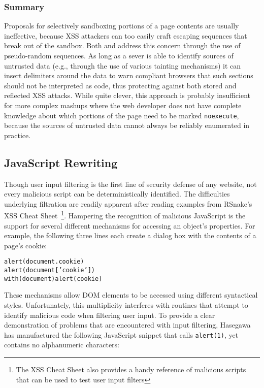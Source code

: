 \documentclass{acmtrans2m}
\begin{document}
\subsubsection*{Summary}
Proposals for selectively sandboxing portions of a page contents are usually ineffective, because XSS attackers can too easily craft escaping sequences that break out of the sandbox.
Both  and  address this concern through the use of pseudo-random sequences.
 As long as a sever is able to identify sources of untrusted data (e.g., through the use of various tainting mechanisms) it can insert delimiters around the data to warn compliant browsers that such sections should not be interpreted as code, thus protecting against both stored and reflected XSS attacks.
While quite clever, this approach is probably insufficient for more complex mashups where the web developer does not have complete knowledge about which portions of the page need to be marked \texttt{noexecute}, because the sources of untrusted data cannot always be reliably enumerated in practice.

\subsection{JavaScript Rewriting}\label{sec:jsfilter-problems}
Though user input filtering is the first line of security defense of any website, not every malicious script can be deterministically identified.
The difficulties underlying filtration are readily apparent after reading examples from RSnake's XSS Cheat Sheet~\cite{xsscheatsheet}\footnote{The XSS Cheat Sheet also provides a handy reference of malicious scripts that can be used to test user input filters}.
Hampering the recognition of malicious JavaScript is the support for several different mechanisms for accessing an object's properties.
For example, the following three lines each create a dialog box with the contents of a page's cookie:

\begin{alltt}
alert(document.cookie)
alert(document['cookie'])
with(document) alert(cookie)
\end{alltt}

These mechanisms allow DOM elements to be accessed using different syntactical styles.
Unfortunately, this multiplicity interferes with routines that attempt to identify malicious code when filtering user input.
To provide a clear demonstration of problems that are encountered with input filtering, Hasegawa~\cite{xssfilters} has manufactured the following JavaScript snippet that calls \texttt{alert(1)}, yet contains no alphanumeric characters:
\end{document}
